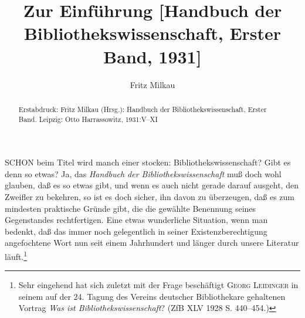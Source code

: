 \documentclass[a4paper,
fontsize=11pt,
oneside,
numbers=noperiodatend,
parskip=half-,
bibliography=totoc,
final
]{scrartcl}
\title{\LARGE{Zur Einführung [Handbuch der Bibliothekswissenschaft, Erster Band, 1931]}}%
\author{Fritz Milkau} %
\date{}
\begin{document}
\maketitle
\thispagestyle{fancyplain} 

\begin{abstract}
\noindent Erstabdruck: Fritz Milkau (Hrsg.): Handbuch der Bibliothekswissenschaft,
Erster Band. Leipzig: Otto Harrassowitz, 1931:V--XI
\end{abstract}


SCHON beim Titel wird manch einer stocken: Bibliothekswissenschaft? Gibt
es denn so etwas? Ja, das \emph{Handbuch der Bibliothekswissenschaft}
muß doch wohl glauben, daß es so etwas gibt, und wenn es auch nicht
gerade darauf ausgeht, den Zweifler zu bekehren, so ist es doch sicher,
ihn davon zu überzeugen, daß es zum mindesten praktische Gründe gibt,
die die gewählte Benennung seines Gegenstandes rechtfertigen. Eine etwas
wunderliche Situation, wenn man bedenkt, daß das immer noch gelegentlich
in seiner Existenzberechtigung angefochtene Wort nun seit einem
Jahrhundert und länger durch unsere Literatur läuft.\footnote{Sehr
  eingehend hat sich zuletzt mit der Frage beschäftigt \textsc{Georg
  Leidinger} in seinem auf der 24. Tagung des Vereins deutscher
  Bibliothekare gehaltenen Vortrag \emph{Was ist
  Bibliothekswissenschaft}? (ZfB XLV 1928 S. 440--454.)}
\end{document}
